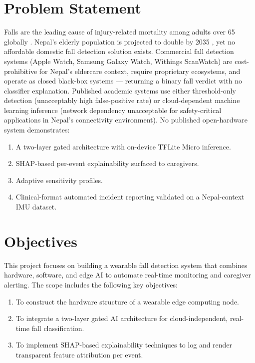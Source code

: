 \section{Problem Statement}

Falls are the leading cause of injury-related mortality among adults over 65 globally \cite{who2007falls}. Nepal's elderly population is projected to double by 2035 \cite{cbs2021nepal}, yet no affordable domestic fall detection solution exists. Commercial fall detection systems (Apple Watch, Samsung Galaxy Watch, Withings ScanWatch) are cost-prohibitive for Nepal's eldercare context, require proprietary ecosystems, and operate as closed black-box systems --- returning a binary fall verdict with no classifier explanation. Published academic systems use either threshold-only detection (unacceptably high false-positive rate) or cloud-dependent machine learning inference (network dependency unacceptable for safety-critical applications in Nepal's connectivity environment). No published open-hardware system demonstrates: 
\begin{enumerate}
\item A two-layer gated architecture with on-device TFLite Micro inference.
\item  SHAP-based per-event explainability surfaced to caregivers.
\item Adaptive sensitivity profiles. 
\item  Clinical-format automated incident reporting validated on a Nepal-context IMU dataset.
\end{enumerate}

\section{Objectives}


	This project focuses on building a wearable fall detection system that combines hardware, software, and edge AI to automate real-time monitoring and caregiver alerting. The scope includes the following key objectives:
\begin{enumerate}
\item To construct the hardware structure of a wearable edge computing node.

\item To integrate a two-layer gated AI architecture for cloud-independent, real-time fall classification.

\item To implement SHAP-based explainability techniques to log and render transparent feature attribution per event.
\end{enumerate}

